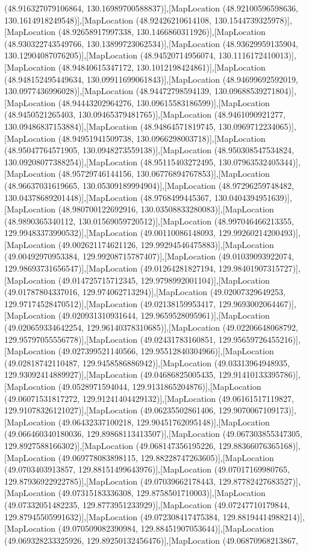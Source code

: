 (48.916327079106864, 130.16989700588837)],[MapLocation (48.92100596598636, 130.1614918249548)],[MapLocation (48.92426210614108, 130.1544739325978)],[MapLocation (48.92658917997338, 130.1466860311926)],[MapLocation (48.930322743549766, 130.13899723062534)],[MapLocation (48.93629959135904, 130.12904087076205)],[MapLocation (48.94520714956074, 130.1116172410013)],[MapLocation (48.94840615347172, 130.1012198424861)],[MapLocation (48.948152495449634, 130.09911699061843)],[MapLocation (48.94699692592019, 130.0977436996028)],[MapLocation (48.94472798594139, 130.09688539271804)],[MapLocation (48.94443202964276, 130.09615583186599)],[MapLocation (48.9450521265403, 130.09465379481765)],[MapLocation (48.9461090921277, 130.09486837153884)],[MapLocation (48.94864571819745, 130.0969712234065)],[MapLocation (48.94951941509738, 130.0966298003718)],[MapLocation (48.95047764571905, 130.0948273559138)],[MapLocation (48.950308547534824, 130.09208077388254)],[MapLocation (48.95115403272495, 130.07963532405344)],[MapLocation (48.95729746144156, 130.06776894767853)],[MapLocation (48.96637031619665, 130.05309189994904)],[MapLocation (48.97296259748482, 130.04378689201448)],[MapLocation (48.9768499445367, 130.0404394951639)],[MapLocation (48.980700122692916, 130.03508833280083)],[MapLocation (48.9890365340112, 130.01569059720512)],[MapLocation (48.997046466213355, 129.99483373990532)],[MapLocation (49.00110086148093, 129.99260214200493)],[MapLocation (49.002621174621126, 129.99294546475883)],[MapLocation (49.00492970953384, 129.99208715787407)],[MapLocation (49.01039093922074, 129.98693731656547)],[MapLocation (49.01264281827194, 129.98401907315727)],[MapLocation (49.014725715712345, 129.9798992001104)],[MapLocation (49.01787804337016, 129.974062713294)],[MapLocation (49.02007329649253, 129.97174528470512)],[MapLocation (49.02138159953417, 129.9693002064467)],[MapLocation (49.020931310931644, 129.9659528095961)],[MapLocation (49.020659334642254, 129.96140378310685)],[MapLocation (49.02206648068792, 129.95797055556778)],[MapLocation (49.02431783160851, 129.95659726455216)],[MapLocation (49.027399521140566, 129.95512840304966)],[MapLocation (49.02818742110487, 129.9458586886942)],[MapLocation (49.03313964948935, 129.93092414889927)],[MapLocation (49.04686825005435, 129.91410133395786)],[MapLocation (49.0528971594044, 129.9131865204876)],[MapLocation (49.06071531817272, 129.91241404429132)],[MapLocation (49.06161517119827, 129.91078326121027)],[MapLocation (49.06235502861406, 129.9070067109173)],[MapLocation (49.06432337100218, 129.90451762095148)],[MapLocation (49.066460340180036, 129.89868113413507)],[MapLocation (49.067303855347305, 129.8927588166302)],[MapLocation (49.068147356195226, 129.88366076365168)],[MapLocation (49.069778083898115, 129.88228747263605)],[MapLocation (49.0703403913857, 129.88151499643976)],[MapLocation (49.07017169980765, 129.87936922922785)],[MapLocation (49.07039662178443, 129.87782427683527)],[MapLocation (49.07315183336308, 129.8758501710003)],[MapLocation (49.07332051482235, 129.8773951233929)],[MapLocation (49.07247710179844, 129.87945505991632)],[MapLocation (49.072308417475384, 129.88194414988214)],[MapLocation (49.070509082390984, 129.88451907053644)],[MapLocation (49.069328233325926, 129.89250132456476)],[MapLocation (49.06870968213867, 